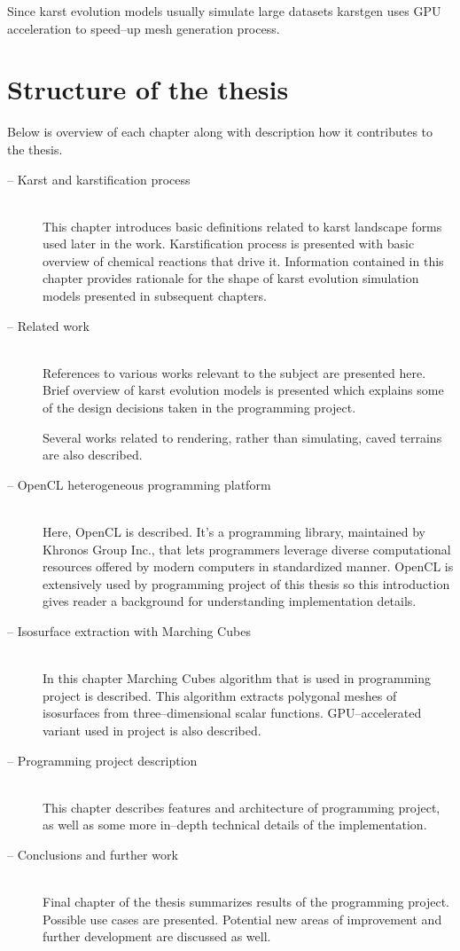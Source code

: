 Since karst evolution models usually simulate large datasets karstgen uses
GPU acceleration to speed--up mesh generation process.

\pagebreak
\section{Structure of the thesis}

Below is overview of each chapter along with description how it contributes to
the thesis.
\begin{description}
  \item[ -- Karst and karstification process] \hfill \\
    This chapter introduces basic definitions related to karst landscape forms
    used later in the work. Karstification process is presented with basic
    overview of chemical reactions that drive it. Information contained in this
    chapter provides rationale for the shape of karst evolution simulation
    models presented in subsequent chapters.
  \item[ -- Related work] \hfill \\
    References to various works relevant to the subject are presented here.
    Brief overview of karst evolution models is presented which explains some
    of the design decisions taken in the programming project.

    Several works related to rendering, rather than simulating, caved terrains
    are also described.
  \item[ -- OpenCL heterogeneous programming platform] \hfill \\
    Here, OpenCL is described. It's a programming library, maintained by Khronos
    Group Inc., that lets programmers leverage diverse computational resources
    offered by modern computers in standardized manner. OpenCL is extensively
    used by programming project of this thesis so this introduction gives
    reader a background for understanding implementation details.
  \item[ -- Isosurface extraction with Marching Cubes] \hfill \\
    In this chapter Marching Cubes algorithm that is used in programming project
    is described. This algorithm extracts polygonal meshes of isosurfaces from
    three--dimensional scalar functions. GPU--accelerated variant used in
    project is also described.
  \item[ -- Programming project description] \hfill \\
    This chapter describes features and architecture of programming project, as
    well as some more in--depth technical details of the implementation.
  \item[ -- Conclusions and further work] \hfill \\
    Final chapter of the thesis summarizes results of the programming project.
    Possible use cases are presented. Potential new areas of improvement and
    further development are discussed as well.
\end{description}


